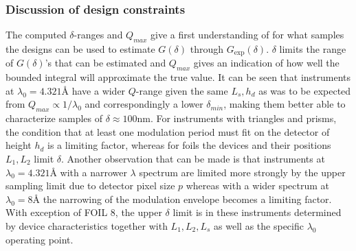 \documentclass{article}
\begin{document}
\subsubsection{Discussion of design constraints}
The computed $\delta$-ranges and $Q_{max}$ give a first understanding of for what samples the designs can be used to estimate $G(\delta)$ through $G_{\text{exp}}(\delta)$. $\delta$ limits the range of $G(\delta)$'s that can be estimated and $Q_{max}$ gives an indication of how well the bounded integral will approximate the true value. It can be seen that instruments at $\lambda_0 = 4.321$Å have a wider $Q$-range given the same $L_s, h_d$ as was to be expected from $Q_{max} \propto 1/\lambda_0$ and correspondingly a lower $\delta_{min}$, making them better able to characterize samples of $\delta \approx 100 \unit{\nano\meter}$. For instruments with triangles and prisms, the condition that at least one modulation period must fit on the detector of height $h_d$ is a limiting factor, whereas for foils the devices and their positions $L_1, L_2$ limit $\delta$. Another observation that can be made is that instruments at $\lambda_0 = 4.321$Å with a narrower $\lambda$ spectrum are limited more strongly by the upper sampling limit due to detector pixel size $p$ whereas with a wider spectrum at $\lambda_0 = 8$Å the narrowing of the modulation envelope becomes a limiting factor. With exception of FOIL 8, the upper $\delta$ limit is in these instruments determined by device characteristics together with $L_1, L_2, L_s$ as well as the specific $\lambda_0$ operating point. 
\end{document}

